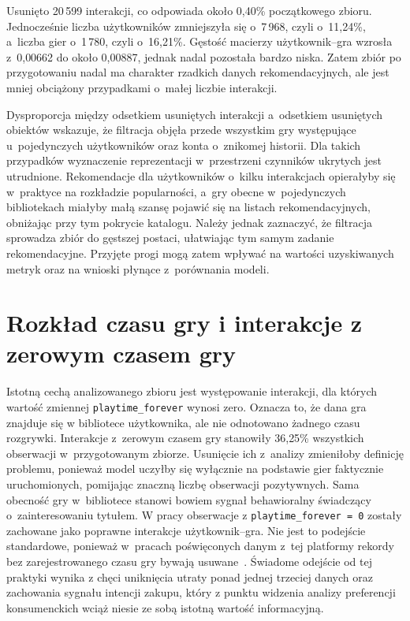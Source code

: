 Usunięto 20\,599 interakcji, co odpowiada około 0{,}40\% początkowego zbioru. Jednocześnie liczba użytkowników zmniejszyła się o~7\,968, czyli o~11{,}24\%, a~liczba gier o~1\,780, czyli o~16{,}21\%. Gęstość macierzy użytkownik--gra wzrosła z~0{,}00662 do około 0{,}00887, jednak nadal pozostała bardzo niska. Zatem zbiór po przygotowaniu nadal ma charakter rzadkich danych rekomendacyjnych, ale jest mniej obciążony przypadkami o~małej liczbie interakcji.

Dysproporcja między odsetkiem usuniętych interakcji a~odsetkiem usuniętych obiektów wskazuje, że filtracja objęła przede wszystkim gry występujące u~pojedynczych użytkowników oraz konta o~znikomej historii. Dla takich przypadków wyznaczenie reprezentacji w~przestrzeni czynników ukrytych jest utrudnione. Rekomendacje dla użytkowników o~kilku interakcjach opierałyby się w~praktyce na rozkładzie popularności, a~gry obecne w~pojedynczych bibliotekach miałyby małą szansę pojawić się na listach rekomendacyjnych, obniżając przy tym pokrycie katalogu. Należy jednak zaznaczyć, że filtracja sprowadza zbiór do gęstszej postaci, ułatwiając tym samym zadanie rekomendacyjne. Przyjęte progi mogą zatem wpływać na wartości uzyskiwanych metryk oraz na wnioski płynące z~porównania modeli.

\section{Rozkład czasu gry i interakcje z zerowym czasem gry}

Istotną cechą analizowanego zbioru jest występowanie interakcji, dla których wartość zmiennej \texttt{playtime\_forever} wynosi zero. Oznacza to, że dana gra znajduje się w bibliotece użytkownika, ale nie odnotowano żadnego czasu rozgrywki. Interakcje z~zerowym czasem gry stanowiły 36{,}25\% wszystkich obserwacji w~przygotowanym zbiorze. Usunięcie ich z~analizy zmieniłoby definicję problemu, ponieważ model uczyłby się wyłącznie na podstawie gier faktycznie uruchomionych, pomijając znaczną liczbę obserwacji pozytywnych. Sama obecność gry w~bibliotece stanowi bowiem sygnał behawioralny świadczący o~zainteresowaniu tytułem. W pracy obserwacje z \texttt{playtime\_forever = 0} zostały zachowane jako poprawne interakcje użytkownik--gra. Nie jest to podejście standardowe, ponieważ w~pracach poświęconych danym z~tej platformy rekordy bez zarejestrowanego czasu gry bywają usuwane~\cite{bunga2021implicit, cheuque2019steam}. Świadome odejście od tej praktyki wynika z chęci uniknięcia utraty ponad jednej trzeciej danych oraz zachowania sygnału intencji zakupu, który z punktu widzenia analizy preferencji konsumenckich wciąż niesie ze sobą istotną wartość informacyjną.

